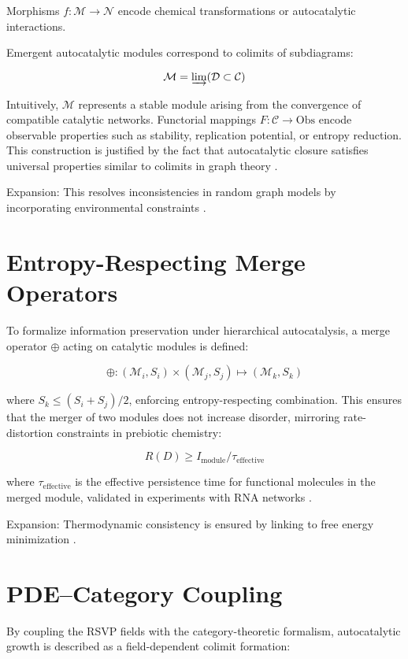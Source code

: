 \documentclass[openany]{book}
\begin{document}
Morphisms $f: \mathcal{M} \to \mathcal{N}$ encode chemical transformations or autocatalytic interactions.

Emergent autocatalytic modules correspond to colimits of subdiagrams:

\[\mathcal{M} = \varinjlim (\mathcal{D} \subset \mathcal{C})\]

Intuitively, $\mathcal{M}$ represents a stable module arising from the convergence of compatible catalytic networks. Functorial mappings $F: \mathcal{C} \to \mathrm{Obs}$ encode observable properties such as stability, replication potential, or entropy reduction. This construction is justified by the fact that autocatalytic closure satisfies universal properties similar to colimits in graph theory \citep{hordijk2010, virgo2013}.

Expansion: This resolves inconsistencies in random graph models by incorporating environmental constraints \citep{vasas2010}.

\section{Entropy-Respecting Merge Operators}
To formalize information preservation under hierarchical autocatalysis, a merge operator $\oplus$ acting on catalytic modules is defined:

\[\oplus: (\mathcal{M}_i, S_i) \times (\mathcal{M}_j, S_j) \mapsto (\mathcal{M}_k, S_k)\]

where $S_k \le (S_i + S_j)/2$, enforcing entropy-respecting combination. This ensures that the merger of two modules does not increase disorder, mirroring rate-distortion constraints in prebiotic chemistry:

\[R(D) \ge I_{\text{module}} / \tau_{\mathrm{effective}}\]

where $\tau_{\mathrm{effective}}$ is the effective persistence time for functional molecules in the merged module, validated in experiments with RNA networks \citep{vincent2022}.

Expansion: Thermodynamic consistency is ensured by linking to free energy minimization \citep{england2015}.

\section{PDE–Category Coupling}
By coupling the RSVP fields with the category-theoretic formalism, autocatalytic growth is described as a field-dependent colimit formation:
\end{document}
